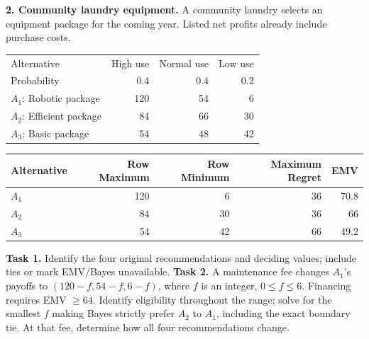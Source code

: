 \begin{studentproblem}
\textbf{2. Community laundry equipment.} A community laundry selects an equipment package for the coming year. Listed net profits already include purchase costs.
\begin{center}\begin{tabular}{lrrr}\toprule Alternative & High use & Normal use & Low use\\
Probability & 0.4 & 0.4 & 0.2\\
\midrule
$A_1$: Robotic package & 120 & 54 & 6\\
$A_2$: Efficient package & 84 & 66 & 30\\
$A_3$: Basic package & 54 & 48 & 42\\
\bottomrule\end{tabular}\end{center}
\begin{center}\begin{tabular}{lrrrr}\toprule Alternative & Row Maximum & Row Minimum & Maximum Regret & EMV\\\midrule
$A_1$ & 120 & 6 & 36 & 70.8\\
$A_2$ & 84 & 30 & 36 & 66\\
$A_3$ & 54 & 42 & 66 & 49.2\\
\bottomrule\end{tabular}\end{center}
\textbf{Task 1.} Identify the four original recommendations and deciding values; include ties or mark EMV/Bayes unavailable.
\choices
\textbf{Task 2.} A maintenance fee changes $A_1$'s payoffs to $(120-f,54-f,6-f)$, where $f$ is an integer, $0\leq f\leq6$. Financing requires EMV $\geq64$. Identify eligibility throughout the range; solve for the smallest $f$ making Bayes strictly prefer $A_2$ to $A_1$, including the exact boundary tie. At that fee, determine how all four recommendations change.
\tasktwobox
\end{studentproblem}

